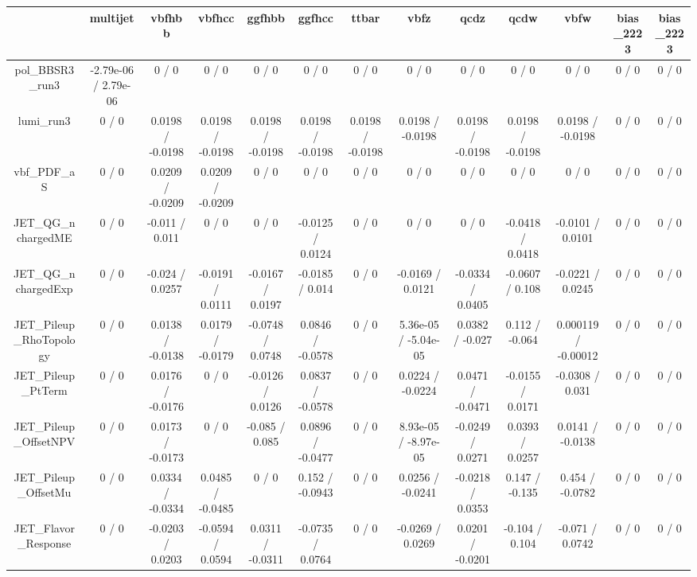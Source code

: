 \documentclass[10pt]{article}
\begin{document}
\begin{table}[htbp]
\begin{center}
\begin{tabular}{|c|c|c|c|c|c|c|c|c|c|c|c|c|}
\hline 
      & multijet      & vbfhbb      & vbfhcc      & ggfhbb      & ggfhcc      & ttbar      & vbfz      & qcdz      & qcdw      & vbfw      & bias_2223      & bias_2223 \\ 
\hline 
  pol_BBSR3_run3 & -2.79e-06 / 2.79e-06 & 0 / 0 & 0 / 0 & 0 / 0 & 0 / 0 & 0 / 0 & 0 / 0 & 0 / 0 & 0 / 0 & 0 / 0 & 0 / 0 & 0 / 0 \\ 
  lumi_run3 & 0 / 0 & 0.0198 / -0.0198 & 0.0198 / -0.0198 & 0.0198 / -0.0198 & 0.0198 / -0.0198 & 0.0198 / -0.0198 & 0.0198 / -0.0198 & 0.0198 / -0.0198 & 0.0198 / -0.0198 & 0.0198 / -0.0198 & 0 / 0 & 0 / 0 \\ 
  vbf_PDF_aS & 0 / 0 & 0.0209 / -0.0209 & 0.0209 / -0.0209 & 0 / 0 & 0 / 0 & 0 / 0 & 0 / 0 & 0 / 0 & 0 / 0 & 0 / 0 & 0 / 0 & 0 / 0 \\ 
  JET_QG_nchargedME & 0 / 0 & -0.011 / 0.011 & 0 / 0 & 0 / 0 & -0.0125 / 0.0124 & 0 / 0 & 0 / 0 & 0 / 0 & -0.0418 / 0.0418 & -0.0101 / 0.0101 & 0 / 0 & 0 / 0 \\ 
  JET_QG_nchargedExp & 0 / 0 & -0.024 / 0.0257 & -0.0191 / 0.0111 & -0.0167 / 0.0197 & -0.0185 / 0.014 & 0 / 0 & -0.0169 / 0.0121 & -0.0334 / 0.0405 & -0.0607 / 0.108 & -0.0221 / 0.0245 & 0 / 0 & 0 / 0 \\ 
  JET_Pileup_RhoTopology & 0 / 0 & 0.0138 / -0.0138 & 0.0179 / -0.0179 & -0.0748 / 0.0748 & 0.0846 / -0.0578 & 0 / 0 & 5.36e-05 / -5.04e-05 & 0.0382 / -0.027 & 0.112 / -0.064 & 0.000119 / -0.00012 & 0 / 0 & 0 / 0 \\ 
  JET_Pileup_PtTerm & 0 / 0 & 0.0176 / -0.0176 & 0 / 0 & -0.0126 / 0.0126 & 0.0837 / -0.0578 & 0 / 0 & 0.0224 / -0.0224 & 0.0471 / -0.0471 & -0.0155 / 0.0171 & -0.0308 / 0.031 & 0 / 0 & 0 / 0 \\ 
  JET_Pileup_OffsetNPV & 0 / 0 & 0.0173 / -0.0173 & 0 / 0 & -0.085 / 0.085 & 0.0896 / -0.0477 & 0 / 0 & 8.93e-05 / -8.97e-05 & -0.0249 / 0.0271 & 0.0393 / 0.0257 & 0.0141 / -0.0138 & 0 / 0 & 0 / 0 \\ 
  JET_Pileup_OffsetMu & 0 / 0 & 0.0334 / -0.0334 & 0.0485 / -0.0485 & 0 / 0 & 0.152 / -0.0943 & 0 / 0 & 0.0256 / -0.0241 & -0.0218 / 0.0353 & 0.147 / -0.135 & 0.454 / -0.0782 & 0 / 0 & 0 / 0 \\ 
  JET_Flavor_Response & 0 / 0 & -0.0203 / 0.0203 & -0.0594 / 0.0594 & 0.0311 / -0.0311 & -0.0735 / 0.0764 & 0 / 0 & -0.0269 / 0.0269 & 0.0201 / -0.0201 & -0.104 / 0.104 & -0.071 / 0.0742 & 0 / 0 & 0 / 0 \\ 

\end{tabular}
\end{center}
\end{table}
\end{document}
